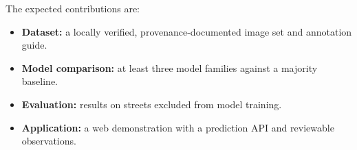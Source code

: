 The expected contributions are:
\begin{itemize}
  \item \textbf{Dataset:} a locally verified, provenance-documented image set and annotation guide.
  \item \textbf{Model comparison:} at least three model families against a majority baseline.
  \item \textbf{Evaluation:} results on streets excluded from model training.
  \item \textbf{Application:} a web demonstration with a prediction API and reviewable observations.
\end{itemize}
